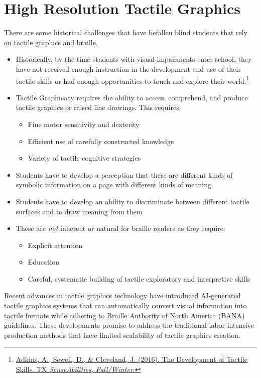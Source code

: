 \section{High Resolution Tactile Graphics}\label{tactile-graphics-high-resolution-complex-graphics}
There are some historical challenges that have befallen blind students that rely on tactile graphics and braille.
\begin{itemize}
 \item Historically, by the time students with visual impairments enter school, they have not received enough instruction in the development and use of their tactile skills or had enough opportunities to touch and explore their world.\footnote{\href{http://www.tsbvi.edu/tx-senseabilities/issues/fall-winter-2016/the-development-of-tactile-skills}{Adkins, A., Sewell, D., \& Cleveland, J. (2016). The Development of Tactile Skills. TX \emph{SenseAbilities, Fall/Winter}.}}
 \item Tactile Graphicacy requires the ability to access, comprehend, and produce tactile graphics or raised line drawings. This requires:
   \begin{itemize}
     \item Fine motor sensitivity and dexterity
     \item Efficient use of carefully constructed knowledge
     \item Variety of tactile-cognitive strategies
   \end{itemize}
 \item Students have to develop a perception that there are different kinds of symbolic information on a page with different kinds of meaning
 \item Students have to develop an ability to discriminate between different tactile surfaces and to draw meaning from them
 \item These are \emph{not} inherent or natural for braille readers as they require:
   \begin{itemize}
     \item Explicit attention
     \item Education
     \item Careful, systematic building of tactile exploratory and interpretive skills
   \end{itemize}
\end{itemize}

Recent advances in tactile graphics technology have introduced AI-generated tactile graphics systems that can automatically convert visual information into tactile formats while adhering to Braille Authority of North America (BANA) guidelines. These developments promise to address the traditional labor-intensive production methods that have limited scalability of tactile graphics creation.

